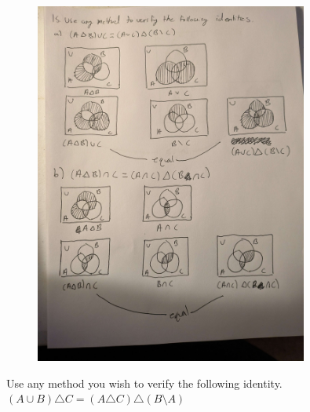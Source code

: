 \begin{figure}[H]
    \centering
    \includegraphics[width=0.8\textwidth]{images/1.2/12.jpg}
\end{figure}

\begin{tcolorbox}[title=Problem 16 (a), breakable]
Use any method you wish to verify the following identity.
$(A \cup B) \triangle C = (A \triangle C) \triangle (B \setminus A)$
\end{tcolorbox}


